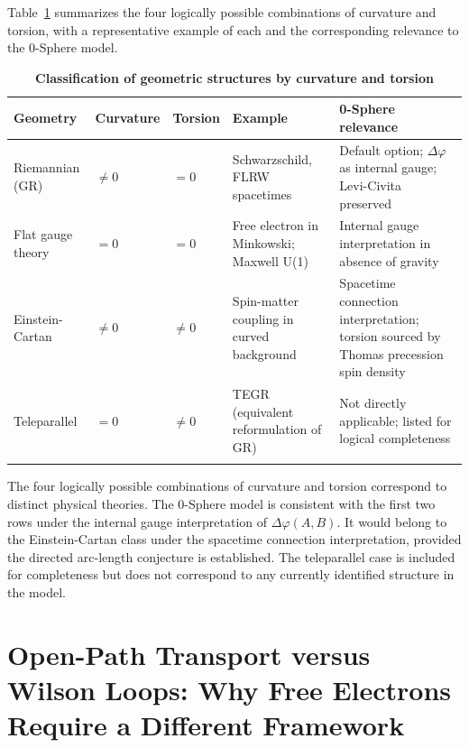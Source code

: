 \documentclass[%
 reprint,
 amsmath,amssymb,
 aps,
 prb,
]{revtex4-2}
\numberwithin{equation}{section}
\begin{document}
Table~\ref{tab:geometry} summarizes the four logically possible combinations of curvature and torsion, with a representative example of each and the corresponding relevance to the 0-Sphere model.

\begin{table}[t!]
\centering
\caption{\textbf{Classification of geometric structures by curvature and torsion}}
\label{tab:geometry}
\renewcommand{\arraystretch}{1.5}
\setlength{\tabcolsep}{7pt}
\begin{tabular}{p{3.5cm}p{2.5cm}p{2.5cm}p{3.5cm}p{3.5cm}}
\toprule
\textbf{Geometry} & \textbf{Curvature} & \textbf{Torsion} & \textbf{Example} & \textbf{0-Sphere relevance} \\
\midrule
Riemannian (GR)
& $\neq 0$ & $= 0$
& Schwarzschild, FLRW spacetimes
& Default option; $\Delta\varphi$ as internal gauge; Levi-Civita preserved \\
\addlinespace[0.3cm]
Flat gauge theory
& $= 0$ & $= 0$
& Free electron in Minkowski; Maxwell U(1)
& Internal gauge interpretation in absence of gravity \\
\addlinespace[0.3cm]
Einstein-Cartan
& $\neq 0$ & $\neq 0$
& Spin-matter coupling in curved background~\cite{hehl1976}
& Spacetime connection interpretation; torsion sourced by Thomas precession spin density \\
\addlinespace[0.3cm]
Teleparallel
& $= 0$ & $\neq 0$
& TEGR (equivalent reformulation of GR)
& Not directly applicable; listed for logical completeness \\
\addlinespace[0.2cm]
\bottomrule
\end{tabular}
\vspace{0.2cm}
\begin{minipage}{0.95\textwidth}
\justifying\footnotesize
The four logically possible combinations of curvature and torsion correspond to distinct physical theories. The 0-Sphere model is consistent with the first two rows under the internal gauge interpretation of $\Delta\varphi(A,B)$. It would belong to the Einstein-Cartan class under the spacetime connection interpretation, provided the directed arc-length conjecture is established. The teleparallel case is included for completeness but does not correspond to any currently identified structure in the model.
\end{minipage}
\end{table}

\section{Open-Path Transport versus Wilson Loops: Why Free Electrons Require a Different Framework}
\label{app:openpath}
\end{document}
